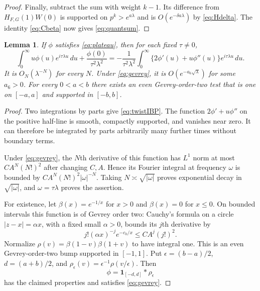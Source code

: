 \documentclass[11pt]{article}
\numberwithin{equation}{section}
\newtheorem{lemma}[theorem]{Lemma}
\theoremstyle{remark}
\begin{document}
\begin{proof}
Finally, subtract the sum with weight $k-1$. Its difference from
$H_{F,G}(1)W(0)$ is supported on $p^k>e^{a\lambda}$ and is
$O(e^{-\delta a\lambda})$ by \eqref{eq:Hdelta}. The identity
\eqref{eq:Cbeta} now gives \eqref{eq:quantsum}.
\end{proof}

\begin{lemma}\label{lem:Gevrey}
If $\phi$ satisfies \eqref{eq:plateau}, then for each fixed
$\tau\ne0$,
\begin{equation}\label{eq:twistIBP}
 \int_0^\infty u\phi(u)e^{i\tau\lambda u}\,du
       +\frac{\phi(0)}{\tau^2\lambda^2}
 =-\frac1{\tau^2\lambda^2}
    \int_0^\infty\{2\phi'(u)+u\phi''(u)\}e^{i\tau\lambda u}\,du.
\end{equation}
It is $O_N(\lambda^{-N})$ for every $N$. Under
\eqref{eq:gevrey}, it is $O(e^{-a_6\sqrt\lambda})$ for some $a_6>0$.
For every $0<a<b$ there exists an even Gevrey-order-two test that is
one on $[-a,a]$ and supported in $[-b,b]$.
\end{lemma}

\begin{proof}
Two integrations by parts give \eqref{eq:twistIBP}. The function
$2\phi'+u\phi''$ on the positive half-line is smooth, compactly
supported, and vanishes near zero. It can therefore be integrated by
parts arbitrarily many further times without boundary terms.

Under \eqref{eq:gevrey}, the $N$th derivative of this function has
$L^1$ norm at most $CA^N(N!)^2$ after changing $C,A$. Hence its
Fourier integral at frequency $\omega$ is bounded by
$CA^N(N!)^2|\omega|^{-N}$. Taking
$N\asymp\sqrt{|\omega|}$ proves exponential decay in
$\sqrt{|\omega|}$, and $\omega=\tau\lambda$ proves the assertion.

For existence, let $\beta(x)=e^{-1/x}$ for $x>0$ and $\beta(x)=0$
for $x\leq0$. On bounded intervals this function is of Gevrey order
two: Cauchy's formula on a circle $|z-x|=\alpha x$, with a fixed
small $\alpha>0$, bounds its $j$th derivative by
\[
 j!(\alpha x)^{-j}e^{-c_0/x}\leq CA^j(j!)^2.
\]
Normalize $\rho(v)=\beta(1-v)\beta(1+v)$ to have integral one.
This is an even Gevrey-order-two bump supported in $[-1,1]$.
Put $\epsilon=(b-a)/2$, $d=(a+b)/2$, and
$\rho_\epsilon(v)=\epsilon^{-1}\rho(v/\epsilon)$. Then
\[
 \phi=\mathbf1_{[-d,d]}*\rho_\epsilon
\]
has the claimed properties and satisfies \eqref{eq:gevrey}.
\end{proof}
\end{document}
